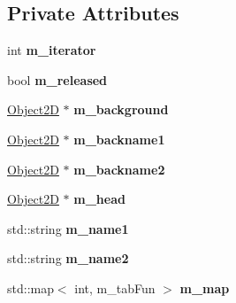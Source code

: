 \subsection*{Private Attributes}
\begin{DoxyCompactItemize}
\item 
\hypertarget{class_mult_state_a527f979c56d1c580bb1c6d851279e026}{}int {\bfseries m\+\_\+iterator}\label{class_mult_state_a527f979c56d1c580bb1c6d851279e026}

\item 
\hypertarget{class_mult_state_a046dcb5c3efc3102b0c1ce2f2a34ada1}{}bool {\bfseries m\+\_\+released}\label{class_mult_state_a046dcb5c3efc3102b0c1ce2f2a34ada1}

\item 
\hypertarget{class_mult_state_a46538b0acac56daa4d3b766a8b14a2ca}{}\hyperlink{class_object2_d}{Object2\+D} $\ast$ {\bfseries m\+\_\+background}\label{class_mult_state_a46538b0acac56daa4d3b766a8b14a2ca}

\item 
\hypertarget{class_mult_state_a22799ed3bb74ef45fdb125b8b5f5799c}{}\hyperlink{class_object2_d}{Object2\+D} $\ast$ {\bfseries m\+\_\+backname1}\label{class_mult_state_a22799ed3bb74ef45fdb125b8b5f5799c}

\item 
\hypertarget{class_mult_state_a18cb341437059540e8ae658c0df60682}{}\hyperlink{class_object2_d}{Object2\+D} $\ast$ {\bfseries m\+\_\+backname2}\label{class_mult_state_a18cb341437059540e8ae658c0df60682}

\item 
\hypertarget{class_mult_state_ae4c06ac4b2bd5312de0a41a2c7c00dd5}{}\hyperlink{class_object2_d}{Object2\+D} $\ast$ {\bfseries m\+\_\+head}\label{class_mult_state_ae4c06ac4b2bd5312de0a41a2c7c00dd5}

\item 
\hypertarget{class_mult_state_a4d164f65b42679b0419f7e4e9cf6e47a}{}std\+::string {\bfseries m\+\_\+name1}\label{class_mult_state_a4d164f65b42679b0419f7e4e9cf6e47a}

\item 
\hypertarget{class_mult_state_a064c6ac5008a32c4632044271b2d9409}{}std\+::string {\bfseries m\+\_\+name2}\label{class_mult_state_a064c6ac5008a32c4632044271b2d9409}

\item 
\hypertarget{class_mult_state_ac4877ea25915843781bb2be0e6fc5fec}{}std\+::map$<$ int, m\+\_\+tab\+Fun $>$ {\bfseries m\+\_\+map}\label{class_mult_state_ac4877ea25915843781bb2be0e6fc5fec}


\end{DoxyCompactItemize}
